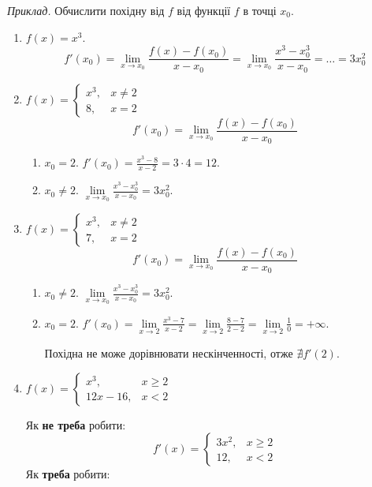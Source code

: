 \documentclass[12pt]{report}
\begin{document}
\textit{Приклад.} Обчислити похідну від $f$ від функції $f$ в точці $x_0$.
\begin{enumerate}

\item $f(x) = x^3$.
$$f'(x_0) = \lim_{x\to x_0}\frac{f(x) - f(x_0)}{x - x_0} = \lim_{x\to x_0}\frac{x^3 - x_0^3}{x - x_0} = \ldots = 3 x_0^2$$

\item $f(x) = \begin{cases} x^3,& x \neq 2 \\ 8, & x = 2\end{cases}$
$$f'(x_0) = \lim_{x \to x_0}\frac{f(x) - f(x_0)}{x - x_0}$$
\begin{enumerate}
\item $x_0 = 2$. $f'(x_0) = \frac{x^3 - 8}{x - 2} = 3 \cdot 4 = 12.$
\item $x_0 \neq 2$. $\lim\limits_{x \to x_0} \frac{x^3 - x_0^3}{x - x_0} = 3 x_0^2$. 
\end{enumerate}

\item $f(x) = \begin{cases} x^3,& x \neq 2 \\ 7, & x = 2\end{cases}$
$$f'(x_0) = \lim_{x \to x_0}\frac{f(x) - f(x_0)}{x - x_0}$$
\begin{enumerate}
\item $x_0 \neq 2$. $\lim\limits_{x \to x_0} \frac{x^3 - x_0^3}{x - x_0} = 3 x_0^2$. 
\item $x_0 = 2$. $f'(x_0) = \lim\limits_{x\to 2}\frac{x^3 - 7}{x - 2} = \lim\limits_{x\to 2}\frac{8 - 7}{2 - 2} = \lim\limits_{x\to 2}\frac{1}{0} = +\infty$.

Похідна не може дорівнювати нескінченності, отже $\nexists f'(2)$. 
\end{enumerate}

\item $f(x) = \begin{cases} x^3,& x \geq 2 \\ 12x - 16, & x < 2\end{cases}$

Як \textbf{не треба} робити:
$$f'(x) = \begin{cases} 3 x^2,& x \geq 2 \\ 12, & x < 2\end{cases}$$
Як \textbf{треба} робити:

\vspace{1mm}


\end{enumerate}
\end{document}
